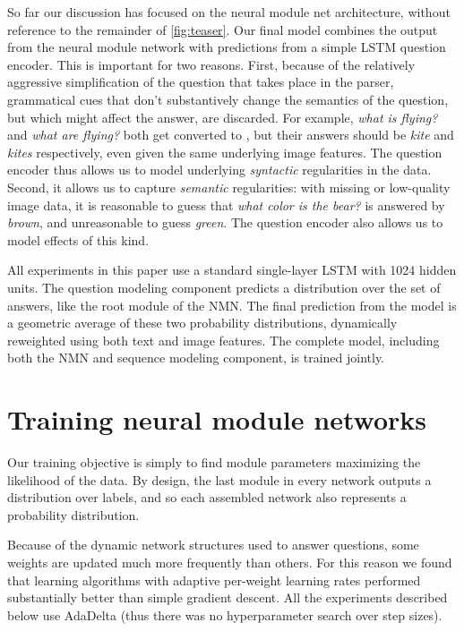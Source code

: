 So far our discussion has focused on the neural module net architecture, without
reference to the remainder of \autoref{fig:teaser}. Our final model combines the output
from the neural module network with predictions from a simple LSTM question
encoder. This is important for two reasons. First, because of the relatively
aggressive simplification of the question that takes place in the parser,
grammatical cues that don't substantively change the semantics of the question,
but which might affect the answer, are discarded. For example, \emph{what is
flying?} and \emph{what are flying?} both get converted to , but
their answers should be \emph{kite} and \emph{kites} respectively, even given
the same underlying image features. The question encoder thus allows us to model
underlying \emph{syntactic} regularities in the data. Second, it allows us to
capture \emph{semantic} regularities: with missing or low-quality image data, it
is reasonable to guess that \emph{what color is the bear?} is answered by
\emph{brown}, and unreasonable to guess \emph{green}. The question encoder also
allows us to model effects of this kind.

All experiments in this paper use a standard single-layer LSTM with 1024 hidden
units. The question modeling component predicts a distribution over the set of
answers, like the root module of the NMN. The final prediction from the model is
a geometric average of these two probability distributions, dynamically
reweighted using both text and image features. The complete model, including
both the NMN and sequence modeling component, is trained jointly.

\section{Training neural module networks}

Our training objective is simply to find module parameters maximizing the
likelihood of the data. By design, the last module in every network outputs a
distribution over labels, and so each assembled network also represents a
probability distribution.

Because of the dynamic network structures used to answer questions, some weights
are updated much more frequently than others. For this reason we found that
learning algorithms with adaptive per-weight learning rates performed
substantially better than simple gradient descent. All the experiments described
below use AdaDelta \cite{Zeiler12Adadelta}  (thus there was no hyperparameter
search over step sizes).

